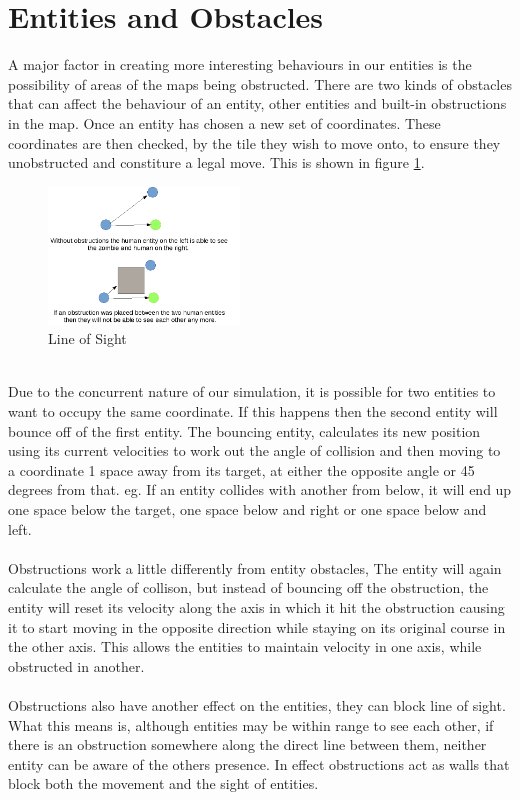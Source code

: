 \documentclass[10pt, a4paper, conference, compsocconf]{IEEEtran}
\begin{document}
\section{Entities and Obstacles \label{obstacles_b}}
A major factor in creating more interesting behaviours in our entities is the possibility of areas of the maps being obstructed. There are two kinds of obstacles that can affect the behaviour of an entity, other entities and built-in obstructions in the map. Once an entity has chosen a new set of coordinates. These coordinates are then checked, by the tile they wish to move onto, to ensure they unobstructed and constiture a legal move. This is shown in figure \ref{fig:obs_los}.\\
\begin{figure}[h]
  \centering
  \includegraphics[width=2in]{../img/los_demo.png}
\caption{Line of Sight}
    \label{fig:obs_los}
\end{figure}
\\
Due to the concurrent nature of our simulation, it is possible for two entities to want to occupy the same coordinate. If this happens then the second entity will bounce off of the first entity. The bouncing entity, calculates its new position using its current velocities to work out the angle of collision and then moving to a coordinate 1 space away from its target, at either the opposite angle or 45 degrees from that. eg. If an entity collides with another from below, it will end up one space below the target, one space below and right or one space below and left.\\
\\
Obstructions work a little differently from entity obstacles, The entity will again calculate the angle of collison, but instead of bouncing off the obstruction, the entity will reset its velocity along the axis in which it hit the obstruction causing it to start moving in the opposite direction while staying on its original course in the other axis. This allows the entities to maintain velocity in one axis, while obstructed in another.\\
\\
Obstructions also have another effect on the entities, they can block line of sight. What this means is, although entities may be within range to see each other, if there is an obstruction somewhere along the direct line between them, neither entity can be aware of the others presence. In effect obstructions act as walls that block both the movement and the sight of entities.\\
\end{document}
